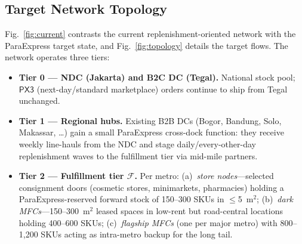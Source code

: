 \documentclass[journal]{IEEEtran}
\begin{document}
\subsection{Target Network Topology}
Fig.~\ref{fig:current} contrasts the current replenishment-oriented network with the ParaExpress target state, and Fig.~\ref{fig:topology} details the target flows. The network operates three tiers:
\begin{itemize}[leftmargin=*]
  \item \textbf{Tier 0 --- NDC (Jakarta) and B2C DC (Tegal).} National stock pool; $\mathsf{PX3}$ (next-day/standard marketplace) orders continue to ship from Tegal unchanged.
  \item \textbf{Tier 1 --- Regional hubs.} Existing B2B DCs (Bogor, Bandung, Solo, Makassar, \dots) gain a small ParaExpress cross-dock function: they receive weekly line-hauls from the NDC and stage daily/every-other-day replenishment waves to the fulfillment tier via mid-mile partners.
  \item \textbf{Tier 2 --- Fulfillment tier $\mathcal{F}$.} Per metro: (a)~\emph{store nodes}---selected consignment doors (cosmetic stores, minimarkets, pharmacies) holding a ParaExpress-reserved forward stock of 150--300 SKUs in $\le$5~m$^2$; (b)~\emph{dark MFCs}---150--300~m$^2$ leased spaces in low-rent but road-central locations holding 400--600 SKUs; (c)~\emph{flagship MFCs} (one per major metro) with 800--1{,}200 SKUs acting as intra-metro backup for the long tail.
\end{itemize}
\end{document}
